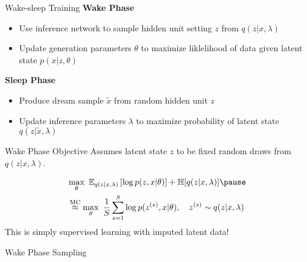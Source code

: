 \documentclass[14pt]{beamer}
\begin{document}
\begin{frame}{Wake-sleep Training}
\textbf{Wake Phase} \\
\begin{itemize}
\item Use inference network to sample hidden unit setting $ z $ from $ q(z|x,\lambda) $
\item Update generation parameters $ \theta $ to maximize liklelihood of data given latent state $ p(x|z,\theta) $
\end{itemize}
\pause
\textbf{Sleep Phase}
\begin{itemize}
\item Produce dream sample $ \tilde{x} $ from random hidden unit $ z $
\item Update inference parameters $ \lambda $ to maximize probability of latent state $ q(z|\tilde{x},\lambda) $
\end{itemize}
\end{frame}

\begin{frame}{Wake Phase Objective}
Assumes latent state $ z $ to be fixed random draws from $ q(z|x,\lambda) $.

\begin{equation*}
\begin{aligned}
&\max_{\theta}~ \mathbb E_{q(z|x, \lambda)}\left[ \log p(z, x| \theta) \right] + \mathbb H[q(z|x, \lambda)]  \pause \\
&\overset{\text{MC}}{\approx} \max_{\theta}~ \frac{1}{S}\sum_{s=1}^{S} \log p(z^{(s)}, x| \theta),~~~z^{(s)} \sim q(z|x,\lambda) 
\end{aligned}
\end{equation*} \pause
This is simply supervised learning with imputed latent data!
\end{frame}

\begin{frame}{Wake Phase Sampling}
\begin{figure}
\center
{}
\end{figure}
\end{frame}
\end{document}
